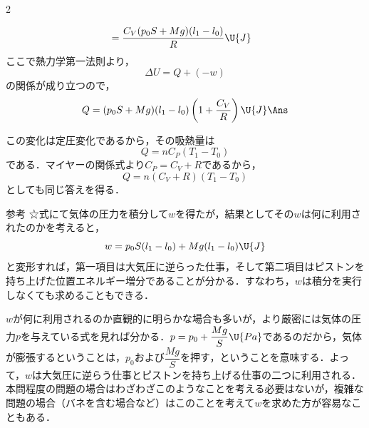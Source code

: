 \begin{multicols}{2}
\begin{komon}
\[\begin{aligned}
                 &=\frac{C_V(p_0S+Mg)(l_1-l_0)}{R}\U{J}
       \end{aligned}\]
       ここで熱力学第一法則より，
       \[\Delta U=Q+(-w)\]
       の関係が成り立つので，
       \[Q=(p_0S+Mg)(l_1-l_0)\left(1+\frac{C_V}{R}\right)\U{J}\Ans\]
\end{komon}
\begin{bekkai}
この変化は定圧変化であるから，その吸熱量は
\[Q=nC_P(T_1-T_0)\]
である．マイヤーの関係式より$C_P=C_V+R$であるから，
\[Q=n(C_V+R)(T_1-T_0)\]
としても同じ答えを得る．
\end{bekkai}
\begin{bsHosoku}{参考}
☆式にて気体の圧力を積分して$w$を得たが，結果としてその$w$は何に利用されたのかを考えると，
\[w=p_0S(l_1-l_0)+Mg(l_1-l_0)\U{J}\]
と変形すれば，第一項目は大気圧に逆らった仕事，そして第二項目はピストンを持ち上げた位置エネルギー増分であることが分かる．すなわち，$w$は積分を実行しなくても求めることもできる．

$w$が何に利用されるのか直観的に明らかな場合も多いが，より厳密には気体の圧力$p$を与えている式を見れば分かる．$p=p_0+\dfrac{Mg}{S}\U{Pa}$であるのだから，気体が膨張するということは，$p_0$および$\dfrac{Mg}{S}$を押す，ということを意味する．よって，$w$は大気圧に逆らう仕事とピストンを持ち上げる仕事の二つに利用される．本問程度の問題の場合はわざわざこのようなことを考える必要はないが，複雑な問題の場合（バネを含む場合など）はこのことを考えて$w$を求めた方が容易なこともある．
\end{bsHosoku}


\end{multicols}

